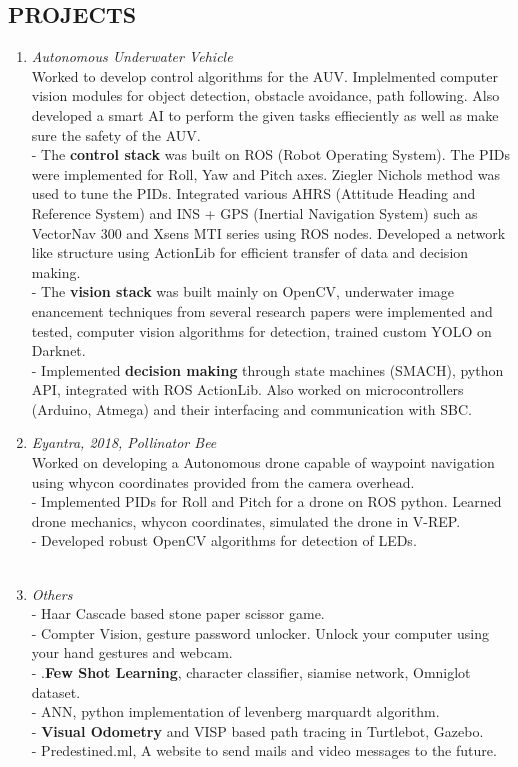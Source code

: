 \documentclass[margin]{res}
\begin{document}
\begin{resume}
\section{PROJECTS } \begin{enumerate}
  \item  {\large{\sl Autonomous Underwater Vehicle}}\\
 Worked to develop control algorithms for the AUV. Implelmented computer vision modules for object detection, obstacle avoidance, path following. Also developed a smart AI to perform the given tasks effieciently as well as make sure the safety of the AUV.\\
        - The   \textbf{control stack} was built on ROS (Robot Operating System). The PIDs were implemented for Roll, Yaw and Pitch axes. Ziegler Nichols method was used to tune the PIDs. Integrated various AHRS (Attitude Heading and Reference System) and INS + GPS (Inertial Navigation System) such as VectorNav 300 and Xsens MTI series using ROS nodes. Developed a network like structure using ActionLib for efficient transfer of data and decision making.\\
        - The   \textbf{vision stack} was built mainly on OpenCV, underwater image enancement techniques from several research papers were implemented and tested, computer vision algorithms for detection, trained custom YOLO on Darknet.\\
	- Implemented   \textbf{decision making} through state machines (SMACH), python API, integrated with ROS ActionLib. Also worked on microcontrollers (Arduino, Atmega) and their interfacing and communication with SBC.
 \item {\large{\sl Eyantra, 2018, Pollinator Bee}}\\
 Worked on developing a Autonomous drone capable of waypoint navigation using whycon coordinates provided from the camera overhead.\\
  	- Implemented PIDs for Roll and Pitch for a drone on ROS python. Learned drone mechanics, whycon coordinates, simulated the drone in V-REP. \\
	- Developed robust OpenCV algorithms for detection of LEDs. \\
\\
 \item {\large{\sl Others}}\\

  	- Haar Cascade based stone paper scissor game. \\
	- Compter Vision, gesture password unlocker. Unlock your computer using your hand gestures and webcam.\\
	- .\textbf{Few Shot Learning}, character  classifier, siamise network,  Omniglot dataset. \\
	- ANN, python implementation of levenberg marquardt algorithm.\\
	- \textbf{Visual Odometry} and VISP based path tracing in Turtlebot, Gazebo.\\
		- Predestined.ml, A website to send mails and video messages to the future. 
	\end{enumerate}




\end{resume}
\end{document}
